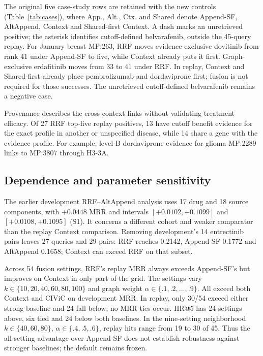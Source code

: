 
The original five case-study rows are retained with the new controls (Table~\ref{tab:cases}), where App., Alt., Ctx. and Shared denote Append-SF, AltAppend, Context and Shared-first Context. A dash marks an unretrieved positive; the asterisk identifies cutoff-defined belvarafenib, outside the 45-query replay. For January breast MP:263, RRF moves evidence-exclusive dovitinib from rank 41 under Append-SF to five, while Context already puts it first. Graph-exclusive erdafitinib moves from 33 to 41 under RRF. In replay, Context and Shared-first already place pembrolizumab and dordaviprone first; fusion is not required for those successes. The unretrieved cutoff-defined belvarafenib remains a negative case.

Provenance describes the cross-context links without validating treatment efficacy. Of 27 RRF top-five replay positives, 13 have cutoff benefit evidence for the exact profile in another or unspecified disease, while 14 share a gene with the evidence profile. For example, level-B dordaviprone evidence for glioma MP:2289 links to MP:3807 through H3-3A.

\subsection{Dependence and parameter sensitivity}
\label{sec:rq4}
The earlier development RRF--AltAppend analysis uses 17 drug and 18 source components, with $+0.0448$ MRR and intervals $[+0.0102,+0.1099]$ and $[+0.0108,+0.1095]$ (S1). It concerns a different cohort and weaker comparator than the replay Context comparison. Removing development's 14 entrectinib pairs leaves 27 queries and 29 pairs: RRF reaches 0.2142, Append-SF 0.1772 and AltAppend 0.1658; Context can exceed RRF on that subset.

Across 54 fusion settings, RRF's replay MRR always exceeds Append-SF's but improves on Context in only part of the grid. The settings vary $k\in\{10,20,40,60,80,100\}$ and graph weight $\alpha\in\{.1,.2,\ldots,.9\}$. All exceed both Context and CIViC on development MRR. In replay, only 30/54 exceed either strong baseline and 24 fall below; no MRR ties occur. HR@5 has 24 settings above, six tied and 24 below both baselines. In the nine-setting neighborhood $k\in\{40,60,80\}$, $\alpha\in\{.4,.5,.6\}$, replay hits range from 19 to 30 of 45. Thus the all-setting advantage over Append-SF does not establish robustness against stronger baselines; the default remains frozen.

